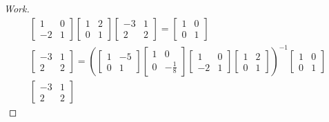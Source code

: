 \documentclass{article}
\begin{document}
\begin{enumerate}
{\begin{proof}[Work]
\begin{align*}
\begin{bmatrix}
                    1  & 0 \\
                    -2 & 1
                \end{bmatrix}
                \begin{bmatrix}
                    1 & 2 \\
                    0 & 1
                \end{bmatrix}
                \begin{bmatrix}
                    -3 & 1 \\
                    2  & 2
                \end{bmatrix} =
                \begin{bmatrix}
                    1 & 0 \\
                    0 & 1
                \end{bmatrix} \\
                \begin{bmatrix}
                    -3 & 1 \\
                    2  & 2
                \end{bmatrix} =
                \left(\begin{bmatrix}
                          1 & -5 \\
                          0 & 1
                      \end{bmatrix}
                \begin{bmatrix}
                    1 & 0            \\
                    0 & -\frac{1}{8}
                \end{bmatrix}
                \begin{bmatrix}
                    1  & 0 \\
                    -2 & 1
                \end{bmatrix}
                \begin{bmatrix}
                    1 & 2 \\
                    0 & 1
                \end{bmatrix}\right)^{-1}
                \begin{bmatrix}
                    1 & 0 \\
                    0 & 1
                \end{bmatrix} \\
                \begin{bmatrix}
                    -3 & 1 \\
                    2  & 2

\end{bmatrix}
\end{align*}
\end{proof}}
\end{enumerate}
\end{document}
